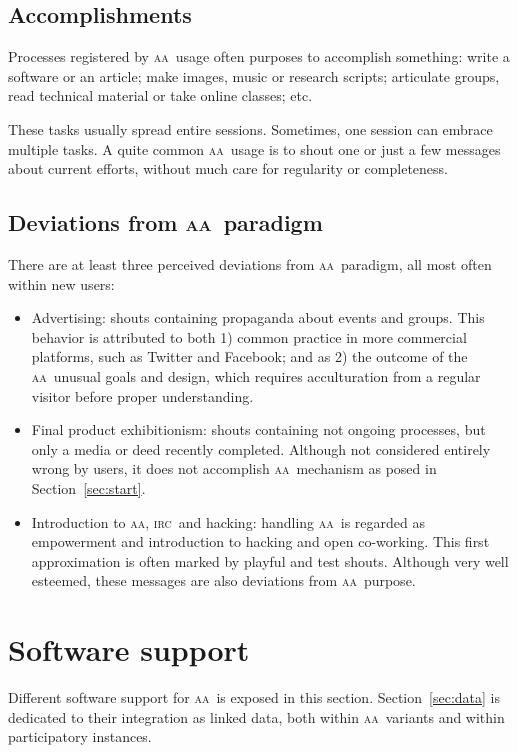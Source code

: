 \documentclass[a4paper, 11pt]{article} %
\newcommand{\irc}{\textsc{irc}}
\newcommand{\aab}{\textsc{aa}}
\begin{document}
\subsection{Accomplishments}\label{sec:usedev}
Processes registered by \aab\ usage often purposes to accomplish something: 
write a software or an article;
make images, music or research scripts; 
articulate groups, read technical material or take online classes; etc. 

These tasks usually spread entire sessions. Sometimes, one session can embrace
multiple tasks. A quite common \aab\ usage is to shout one or just a few
messages about current efforts, without much care for regularity or
completeness.

\subsection{Deviations from \aab\ paradigm}\label{sec:devia}
There are at least three perceived deviations from \aab\ paradigm, all most often within new users:
\begin{itemize}
    \item Advertising: shouts containing propaganda about events and groups. This behavior is attributed to both 1) common practice in more commercial platforms, such as Twitter and Facebook; and as 2) the outcome of the \aab\ unusual goals and design, which requires acculturation from a regular visitor before proper understanding.
    \item Final product exhibitionism: shouts containing not ongoing processes, but only a media or deed recently completed. Although not considered entirely wrong by users, it does not accomplish \aab\ mechanism as posed in Section~\ref{sec:start}.
    \item Introduction to \aab, \irc\ and hacking: handling \aab\ is regarded as empowerment and introduction to hacking and open co-working. This first approximation is often marked by playful and test shouts. Although very well esteemed, these messages are also deviations from \aab\ purpose.
\end{itemize}
 \section{Software support}\label{sec:sofsup}
 Different software support for \aab\ is exposed in this section. Section~\ref{sec:data} is dedicated to their integration as linked data, both within \aab\ variants and within participatory instances.
\end{document}

